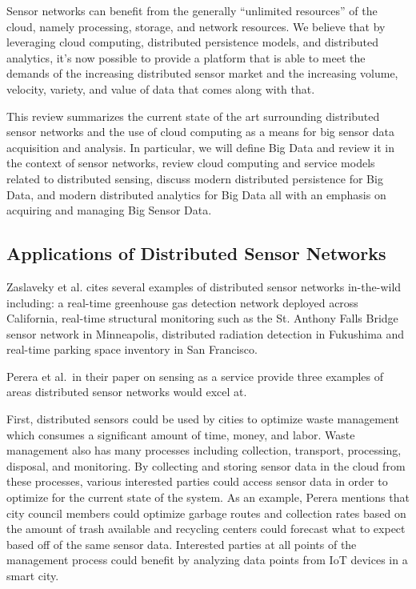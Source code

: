 \documentclass[]{article}
\begin{document}
Sensor networks can benefit from the generally ``unlimited resources'' of the cloud, namely processing, storage, and network resources. We believe that by leveraging cloud computing, distributed persistence models, and distributed analytics, it's now possible to provide a platform that is able to meet the demands of the increasing distributed sensor market and the increasing volume, velocity, variety, and value of data that comes along with that. 

This review summarizes the current state of the art surrounding distributed sensor networks and the use of cloud computing as a means for big sensor data acquisition and analysis. In particular, we will define Big Data and review it in the context of sensor networks, review cloud computing and service models related to distributed sensing, discuss modern distributed persistence for Big Data, and modern distributed analytics for Big Data all with an emphasis on acquiring and managing Big Sensor Data.

\subsection{Applications of Distributed Sensor Networks} \label{ssec:applications-of-distributed-sensor-networks}
Zaslaveky et al.\cite{zaslavsky_sensing_2013} cites several examples of distributed sensor networks in-the-wild including: a real-time greenhouse gas detection network deployed across California, real-time structural monitoring such as the St. Anthony Falls Bridge sensor network in Minneapolis, distributed radiation detection in Fukushima and real-time parking space inventory in San Francisco.

Perera et al.\ in their paper on sensing as a service\cite{perera_sensing_2014} provide three examples of areas distributed sensor networks would excel at. 

First, distributed sensors could be used by cities to optimize waste management which consumes a significant amount of time, money, and labor. Waste management also has many processes including collection, transport, processing, disposal, and monitoring. By collecting and storing sensor data in the cloud from these processes, various interested parties could access sensor data in order to optimize for the current state of the system. As an example, Perera mentions that city council members could optimize garbage routes and collection rates based on the amount of trash available and recycling centers could forecast what to expect based off of the same sensor data. Interested parties at all points of the management process could benefit by analyzing data points from IoT devices in a smart city.
\end{document}
